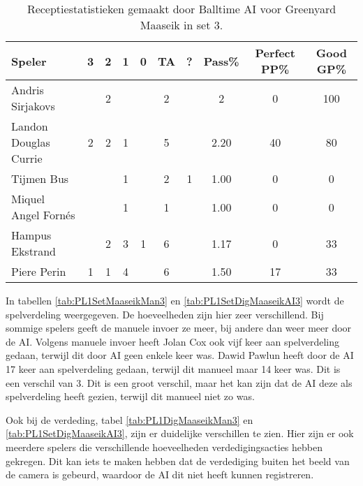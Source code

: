 \begin{table}[ht!]
  \centering
  \scriptsize
  \begin{tabular}{|l|c|c|c|c|c|c|c|c|c|} \hline
    \textbf{Speler} & 3 & 2 & 1 & 0 & TA & ? & Pass\% & Perfect PP\% & Good GP\% \\ \hline
    Andris Sirjakovs &  & 2 &  &  & 2 &  & 2 & 0 & 100 \\
    Landon Douglas Currie & 2 & 2 & 1 &  & 5 &  & 2.20 & 40 & 80 \\
    Tijmen Bus &  &  & 1 &  & 2 & 1 & 1.00 & 0 & 0 \\
    Miquel Angel Fornés &   &  & 1 &  & 1 &  & 1.00 & 0 & 0 \\
    Hampus Ekstrand &  & 2 & 3 & 1 & 6 &  & 1.17 & 0 & 33 \\
    Piere Perin & 1 & 1 & 4 &  & 6 &  & 1.50 & 17 & 33 \\ \hline
  \end{tabular}
  \caption[Receptiestatistieken gemaakt door Balltime AI voor Greenyard Maaseik in set 3]{\label{tab:PL1ReceiveMaaseikAI3}Receptiestatistieken gemaakt door Balltime AI voor Greenyard Maaseik in set 3.}
\end{table}

In tabellen \ref{tab:PL1SetMaaseikMan3} en \ref{tab:PL1SetDigMaaseikAI3} wordt de spelverdeling weergegeven. De hoeveelheden zijn hier zeer verschillend. Bij sommige spelers geeft de manuele invoer ze meer, bij andere dan weer meer door de AI. Volgens manuele invoer heeft Jolan Cox ook vijf keer aan spelverdeling gedaan, terwijl dit door AI geen enkele keer was. Dawid Pawlun heeft door de AI 17 keer aan spelverdeling gedaan, terwijl dit manueel maar 14 keer was. Dit is een verschil van 3. Dit is een groot verschil, maar het kan zijn dat de AI deze als spelverdeling heeft gezien, terwijl dit manueel niet zo was.

Ook bij de verdeding, tabel \ref{tab:PL1DigMaaseikMan3} en \ref{tab:PL1SetDigMaaseikAI3}, zijn er duidelijke verschillen te zien. Hier zijn er ook meerdere spelers die verschillende hoeveelheden verdedigingsacties hebben gekregen. Dit kan iets te maken hebben dat de verdediging buiten het beeld van de camera is gebeurd, waardoor de AI dit niet heeft kunnen registreren.

